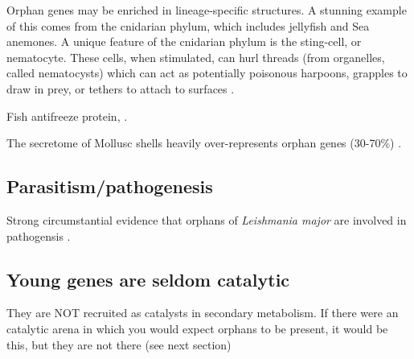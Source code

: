     Orphan genes may be enriched in lineage-specific structures. A stunning
    example of this comes from the cnidarian phylum, which includes jellyfish
    and Sea anemones. A unique feature of the cnidarian phylum is the
    sting-cell, or nematocyte. These cells, when stimulated, can hurl threads
    (from organelles, called nematocysts) which can act as potentially
    poisonous harpoons, grapples to draw in prey, or tethers to attach to
    surfaces \cite{kass-simon_behavioral_2002}.

    Fish antifreeze protein, \cite{chen_evolution_1997}.


    The secretome of Mollusc shells heavily over-represents orphan genes (30-70\%) \cite{aguilera2017co}. 


\subsection{Parasitism/pathogenesis}

  Strong circumstantial evidence that orphans of \textit{Leishmania major} are
  involved in pathogensis \cite{mukherjee_elucidating_2015}.

\subsection{Young genes are seldom catalytic}

    They are NOT recruited as catalysts in secondary metabolism. If there were
    an catalytic arena in which you would expect orphans to be present, it
    would be this, but they are not there (see next section)

